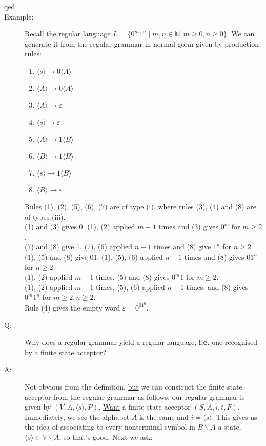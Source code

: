 \documentclass[10pt]{article}
\begin{document}
\begin{description}
		\item[qed]
		\item[Example:] Recall the regular language $L = \{0^m1^n \mid m, n \in \mathbb{N}, m \geq 0, n \geq 0 \}$. We can generate it from the regular grammar in normal gorm given by production rules:
		\begin{enumerate}
			\item $\langle s\rangle  \rightarrow 0\langle A\rangle $
			\item $\langle A\rangle  \rightarrow 0\langle A\rangle $
			\item $\langle A\rangle  \rightarrow \varepsilon$
			\item $\langle s\rangle  \rightarrow \varepsilon$
			\item $\langle A\rangle  \rightarrow 1\langle B\rangle $
			\item $\langle B\rangle  \rightarrow 1\langle B\rangle $
			\item $\langle s\rangle  \rightarrow 1\langle B\rangle $
			\item $\langle B\rangle  \rightarrow \varepsilon$
		\end{enumerate}
		Rules (1), (2), (5), (6), (7) are of type (i), where rules (3), (4) and (8) are of types (iii). \\
		(1) and (3) gives 0. (1), (2) applied $m-1$ times and (3) gives $0^m$ for $m \geq 2$. \\
		(7) and (8) give 1. (7), (6) applied $n-1$ times and (8) give $1^n$ for $n \geq 2$. \\
		(1), (5) and (8) give 01. (1), (5), (6) applied $n-1$ times and (8) gives $01^n$ for $n \geq 2$. \\
		(1), (2) applied $m-1$ times, (5) and (8) gives $0^m1$ for $m \geq 2$. \\
		(1), (2) applied $m-1$ times, (5), (6) applied $n-1$ times, and (8) gives $0^m1^n$ for $m \geq 2, n \geq 2$. \\
		Rule (4) gives the empty word $\varepsilon = 0^01^0$.
		\item[Q:] Why does a regular grammar yield a regular language, \textbf{i.e.} one recognised by a finite state acceptor?
		\item[A:] Not obvious from the definition, \underline{but} we can construct the finite state acceptor from the regular grammar as follows: our regular grammar is given by $(V, A, \langle s\rangle , P)$.  \underline{Want} a finite state acceptor $(S, A, i, t, F)$. Immediately, we see the alphabet $A$ is the same and $i=\langle s\rangle $. This gives us the idea of associating to every nonterminal symbol in $B \backslash A$ a state. $\langle s\rangle  \in V \backslash A$, so that's good. Next we ask:

\end{description}
\end{document}
